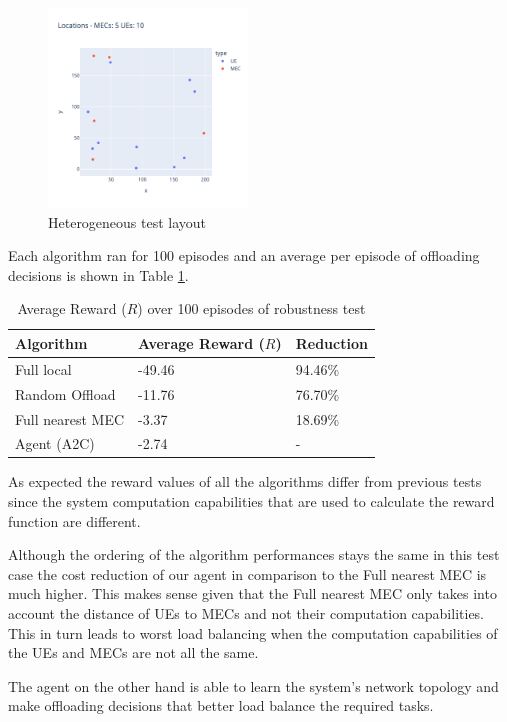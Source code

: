 \begin{figure}[H]
  \centering
  \includegraphics[width=200px]{images/5_10_layout.png}
  \caption{Heterogeneous test layout}  \label{hetero_test}
\end{figure}

Each algorithm ran for 100 episodes and an average per episode of offloading decisions is shown in Table \ref{hetero_table}.

\begin{table}[H]
\centering
\begin{tabular}{|l|l|l|}
\hline
Algorithm        & Average Reward ($R$) & Reduction\\ \hline
Full local       & -49.46 & 94.46\%\\
Random Offload   & -11.76 & 76.70\%\\
Full nearest MEC & -3.37 & 18.69\%\\ 
Agent (A2C) & -2.74 & -\\ \hline
\end{tabular}
\caption{Average Reward ($R$) over 100 episodes of robustness test} \label{hetero_table}
\end{table}

As expected the reward values of all the algorithms differ from previous tests since the system computation capabilities that are used to calculate the reward function are different.

Although the ordering of the algorithm performances stays the same in this test case the cost reduction of our agent in comparison to the Full nearest MEC is much higher. This makes sense given that the Full nearest MEC only takes into account the distance of \acrshort{UE}s to \acrshort{MEC}s and not their computation capabilities. This in turn leads to worst load balancing when the computation capabilities of the \acrshort{UE}s and \acrshort{MEC}s are not all the same.

The agent on the other hand is able to learn the system's network topology and make offloading decisions that better load balance the required tasks. 

